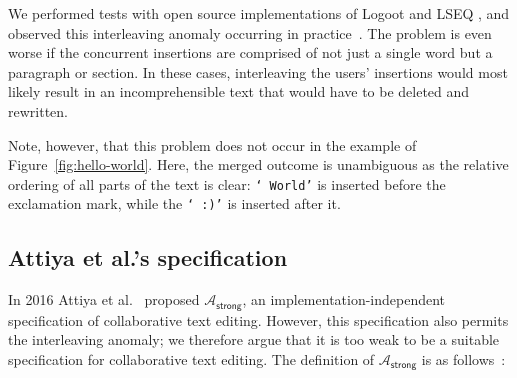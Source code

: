 \documentclass[sigconf]{acmart}
\begin{document}
We performed tests with open source implementations of Logoot \cite{AhmedNacer:2011ke,ReplicationBenchmark} and LSEQ \cite{LSEQTree,Nedelec:2016eo}, and observed this interleaving anomaly occurring in practice~\cite{InterleavingData}.
The problem is even worse if the concurrent insertions are comprised of not just a single word but a paragraph or section.
In these cases, interleaving the users' insertions would most likely result in an incomprehensible text that would have to be deleted and rewritten.

Note, however, that this problem does not occur in the example of Figure~\ref{fig:hello-world}.
Here, the merged outcome is unambiguous as the relative ordering of all parts of the text is clear: \texttt{` World'} is inserted before the exclamation mark, while the \texttt{` :)'} is inserted after it.

\subsection{Attiya et al.'s specification}\label{sec:attiya-spec}

In 2016 Attiya et al.~\cite{Attiya:2016kh} proposed $\mathcal{A}_\textsf{strong}$, an implementation-independent specification of collaborative text editing.
However, this specification also permits the interleaving anomaly; we therefore argue that it is too weak to be a suitable specification for collaborative text editing.
The definition of $\mathcal{A}_\textsf{strong}$ is as follows~\cite{Attiya:2016kh}:
\end{document}
